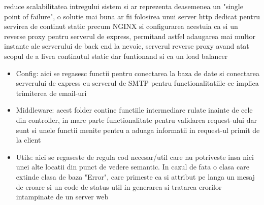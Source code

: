 \documentclass[12pt,a4paper,hidelinks]{report}
\theoremstyle{definition}
\theoremstyle{remark}
\begin{document}
    reduce scalabilitatea intregului sistem si ar reprezenta deasemenea un "single point of failure", o solutie mai buna ar fii folosirea unui server http dedicat pentru servirea de continut static
    precum NGINX si configurarea acestuia ca si un reverse proxy pentru serverul de express, permitand astfel adaugarea mai multor instante ale serverului de back end
     la nevoie, serverul reverse proxy avand atat scopul de a livra continutul static dar funtionand si ca un load balancer
    \begin{itemize}
        \item Config: aici se regasesc functii pentru conectarea la baza de date 
        si conectarea serverului de express cu serverul de SMTP pentru functionalitatiile ce implica trimiterea de email-uri
        \item Middleware: acest folder contine functiile intermediare rulate inainte de cele din controller, in mare parte functionalitate pentru validarea request-ului
        dar sunt si unele functii menite pentru a aduaga informatii in request-ul primit de la client
        \item Utils: aici se regaseste de regula cod necesar/util care nu potriveste insa nici unei alte locatii din punct de vedere semantic.
        In cazul de fata o clasa care extinde clasa de baza "Error", care primeste ca si attribut pe langa un mesaj de eroare si un code de status
        util in generarea si tratarea erorilor intampinate de un server web
    \end{itemize}
\end{document}
